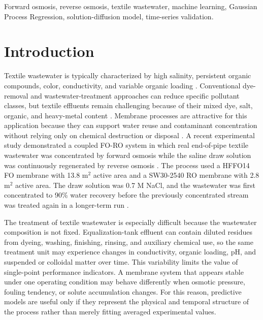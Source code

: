 \documentclass[journal, onecolumn, 12pt]{IEEEtran}
\begin{document}
\begin{IEEEkeywords}
Forward osmosis, reverse osmosis, textile wastewater, machine learning, Gaussian Process Regression, solution-diffusion model, time-series validation.
\end{IEEEkeywords}

\section{Introduction}
Textile wastewater is typically characterized by high salinity, persistent organic compounds, color, conductivity, and variable organic loading \cite{b1,b2,b3}. Conventional dye-removal and wastewater-treatment approaches can reduce specific pollutant classes, but textile effluents remain challenging because of their mixed dye, salt, organic, and heavy-metal content \cite{b4,b5}. Membrane processes are attractive for this application because they can support water reuse and contaminant concentration without relying only on chemical destruction or disposal \cite{b1,b6,b7}. A recent experimental study demonstrated a coupled FO-RO system in which real end-of-pipe textile wastewater was concentrated by forward osmosis while the saline draw solution was continuously regenerated by reverse osmosis \cite{b1}. The process used a HFFO14 FO membrane with 13.8 m$^2$ active area and a SW30-2540 RO membrane with 2.8 m$^2$ active area. The draw solution was 0.7 M NaCl, and the wastewater was first concentrated to 90\% water recovery before the previously concentrated stream was treated again in a longer-term run \cite{b1}.

The treatment of textile wastewater is especially difficult because the wastewater composition is not fixed. Equalization-tank effluent can contain diluted residues from dyeing, washing, finishing, rinsing, and auxiliary chemical use, so the same treatment unit may experience changes in conductivity, organic loading, pH, and suspended or colloidal matter over time. This variability limits the value of single-point performance indicators. A membrane system that appears stable under one operating condition may behave differently when osmotic pressure, fouling tendency, or solute accumulation changes. For this reason, predictive models are useful only if they represent the physical and temporal structure of the process rather than merely fitting averaged experimental values.
\end{document}
